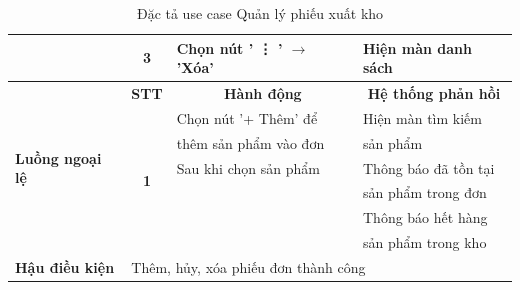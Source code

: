 \documentclass[../DoAn.tex]{subfiles}
\begin{document}
\begin{table}[H]
\begin{tabular}{|l|c|l|l|}
                                                 & \multirow{1}{*}{\textbf{3}}                                        & Chọn nút ' \vdots{} ' $\rightarrow$ 'Xóa' & Hiện màn danh sách                              \\ \hline
        \multirow{7}{*}{\textbf{Luồng ngoại lệ}} & \multicolumn{1}{c|}{\textbf{STT}}                                  & \multicolumn{1}{c|}{\textbf{Hành động}}   & \multicolumn{1}{c|}{\textbf{Hệ thống phản hồi}} \\ \cline{2-4}
                                                 & \multirow{6}{*}{\textbf{1}}                                        & Chọn nút '+ Thêm' để                      & Hiện màn tìm kiếm                               \\
                                                 &                                                                    & thêm sản phẩm vào đơn                     & sản phẩm                                        \\ \cline{3-4}
                                                 &                                                                    & Sau khi chọn sản phẩm                     & Thông báo đã tồn tại                            \\
                                                 &                                                                    &                                           & sản phẩm trong đơn                              \\ \cline{4-4}
                                                 &                                                                    &                                           & Thông báo hết hàng                              \\
                                                 &                                                                    &                                           & sản phẩm trong kho                              \\ \hline
        \textbf{Hậu điều kiện}                   & \multicolumn{3}{l|}{Thêm, hủy, xóa phiếu đơn thành công}                                                                                                         \\ \hline
    \end{tabular}
    \caption{Đặc tả use case Quản lý phiếu xuất kho}
    \label{table:uc-exportreport-manage}
\end{table}
\vfill
\break
\end{document}
